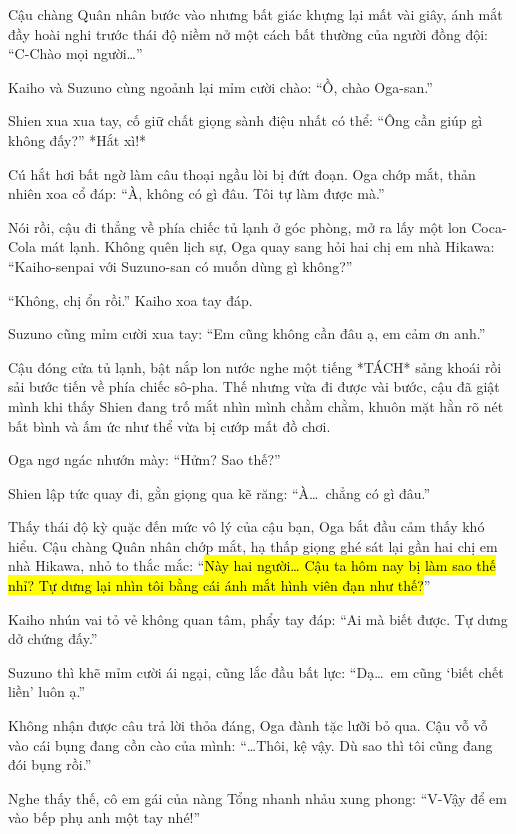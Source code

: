 \documentclass[../main.tex]{subfiles}
\begin{document}

Cậu chàng Quân nhân bước vào nhưng bất giác khựng lại mất vài giây, ánh mắt đầy hoài nghi trước thái độ niềm nở một cách bất thường của người đồng đội: ``C-Chào mọi người\dots''

Kaiho và Suzuno cùng ngoảnh lại mỉm cười chào: ``Ồ, chào Oga-san.''

Shien xua xua tay, cố giữ chất giọng sành điệu nhất có thể: ``Ông cần giúp gì không đấy?'' *Hắt xì!*

Cú hắt hơi bất ngờ làm câu thoại ngầu lòi bị đứt đoạn. Oga chớp mắt, thản nhiên xoa cổ đáp: ``À, không có gì đâu. Tôi tự làm được mà.''

Nói rồi, cậu đi thẳng về phía chiếc tủ lạnh ở góc phòng, mở ra lấy một lon Coca-Cola mát lạnh. Không quên lịch sự, Oga quay sang hỏi hai chị em nhà Hikawa: ``Kaiho-senpai với Suzuno-san có muốn dùng gì không?''

``Không, chị ổn rồi.'' Kaiho xoa tay đáp.

Suzuno cũng mỉm cười xua tay: ``Em cũng không cần đâu ạ, em cảm ơn anh.''

Cậu đóng cửa tủ lạnh, bật nắp lon nước nghe một tiếng *TÁCH* sảng khoái rồi sải bước tiến về phía chiếc sô-pha. Thế nhưng vừa đi được vài bước, cậu đã giật mình khi thấy Shien đang trố mắt nhìn mình chằm chằm, khuôn mặt hằn rõ nét bất bình và ấm ức như thể vừa bị cướp mất đồ chơi.


Oga ngơ ngác nhướn mày: ``Hửm? Sao thế?''

Shien lập tức quay đi, gằn giọng qua kẽ răng: ``À\dots\ chẳng có gì đâu.''

Thấy thái độ kỳ quặc đến mức vô lý của cậu bạn, Oga bắt đầu cảm thấy khó hiểu. Cậu chàng Quân nhân chớp mắt, hạ thấp giọng ghé sát lại gần hai chị em nhà Hikawa, nhỏ to thắc mắc: ``\hl{Này hai người\dots{} Cậu ta hôm nay bị làm sao thế nhỉ? Tự dưng lại nhìn tôi bằng cái ánh mắt hình viên đạn như thế?}''

Kaiho nhún vai tỏ vẻ không quan tâm, phẩy tay đáp: ``Ai mà biết được. Tự dưng dở chứng đấy.''

Suzuno thì khẽ mỉm cười ái ngại, cũng lắc đầu bất lực: ``Dạ\dots\ em cũng `biết chết liền' luôn ạ.''

Không nhận được câu trả lời thỏa đáng, Oga đành tặc lưỡi bỏ qua. Cậu vỗ vỗ vào cái bụng đang cồn cào của mình: ``\dots Thôi, kệ vậy. Dù sao thì tôi cũng đang đói bụng rồi.''

Nghe thấy thế, cô em gái của nàng Tổng nhanh nhảu xung phong: ``V-Vậy để em vào bếp phụ anh một tay nhé!''
\end{document}
